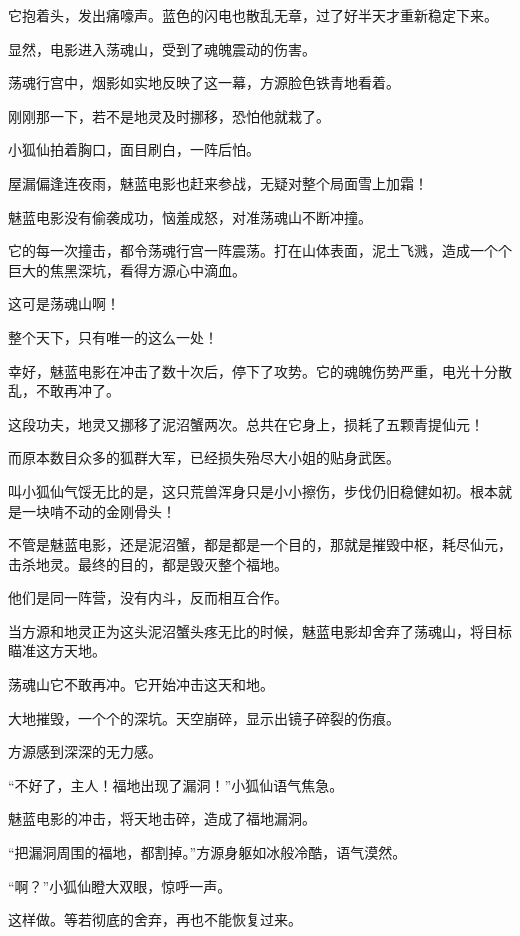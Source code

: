 
\begin{this_body}

它抱着头，发出痛嚎声。蓝色的闪电也散乱无章，过了好半天才重新稳定下来。

显然，电影进入荡魂山，受到了魂魄震动的伤害。

荡魂行宫中，烟影如实地反映了这一幕，方源脸色铁青地看着。

刚刚那一下，若不是地灵及时挪移，恐怕他就栽了。

小狐仙拍着胸口，面目刷白，一阵后怕。

屋漏偏逢连夜雨，魅蓝电影也赶来参战，无疑对整个局面雪上加霜！

魅蓝电影没有偷袭成功，恼羞成怒，对准荡魂山不断冲撞。

它的每一次撞击，都令荡魂行宫一阵震荡。打在山体表面，泥土飞溅，造成一个个巨大的焦黑深坑，看得方源心中滴血。

这可是荡魂山啊！

整个天下，只有唯一的这么一处！

幸好，魅蓝电影在冲击了数十次后，停下了攻势。它的魂魄伤势严重，电光十分散乱，不敢再冲了。

这段功夫，地灵又挪移了泥沼蟹两次。总共在它身上，损耗了五颗青提仙元！

而原本数目众多的狐群大军，已经损失殆尽大小姐的贴身武医。

叫小狐仙气馁无比的是，这只荒兽浑身只是小小擦伤，步伐仍旧稳健如初。根本就是一块啃不动的金刚骨头！

不管是魅蓝电影，还是泥沼蟹，都是都是一个目的，那就是摧毁中枢，耗尽仙元，击杀地灵。最终的目的，都是毁灭整个福地。

他们是同一阵营，没有内斗，反而相互合作。

当方源和地灵正为这头泥沼蟹头疼无比的时候，魅蓝电影却舍弃了荡魂山，将目标瞄准这方天地。

荡魂山它不敢再冲。它开始冲击这天和地。

大地摧毁，一个个的深坑。天空崩碎，显示出镜子碎裂的伤痕。

方源感到深深的无力感。

“不好了，主人！福地出现了漏洞！”小狐仙语气焦急。

魅蓝电影的冲击，将天地击碎，造成了福地漏洞。

“把漏洞周围的福地，都割掉。”方源身躯如冰般冷酷，语气漠然。

“啊？”小狐仙瞪大双眼，惊呼一声。

这样做。等若彻底的舍弃，再也不能恢复过来。


\end{this_body}
